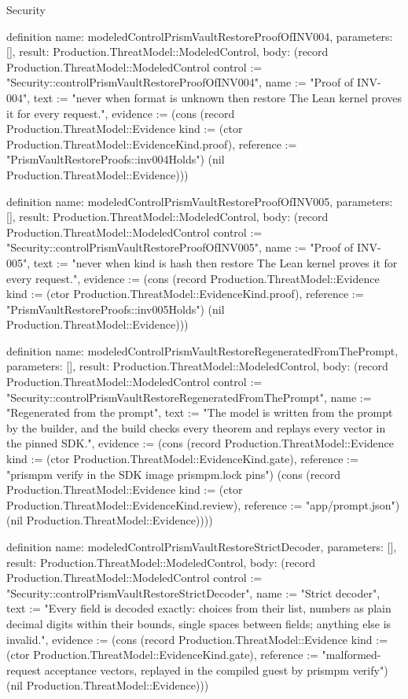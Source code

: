 \begin{lexlean}{Security}
\begin{semanticmodule}
definition{
  name: modeledControlPrismVaultRestoreProofOfINV004,
  parameters: [],
  result: Production.ThreatModel::ModeledControl,
  body: (record Production.ThreatModel::ModeledControl {control := "Security::controlPrismVaultRestoreProofOfINV004", name := "Proof of INV-004", text := "never when format is unknown then restore The Lean kernel proves it for every request.", evidence := (cons (record Production.ThreatModel::Evidence {kind := (ctor Production.ThreatModel::EvidenceKind.proof), reference := "PrismVaultRestoreProofs::inv004Holds"}) (nil Production.ThreatModel::Evidence))})
}

definition{
  name: modeledControlPrismVaultRestoreProofOfINV005,
  parameters: [],
  result: Production.ThreatModel::ModeledControl,
  body: (record Production.ThreatModel::ModeledControl {control := "Security::controlPrismVaultRestoreProofOfINV005", name := "Proof of INV-005", text := "never when kind is hash then restore The Lean kernel proves it for every request.", evidence := (cons (record Production.ThreatModel::Evidence {kind := (ctor Production.ThreatModel::EvidenceKind.proof), reference := "PrismVaultRestoreProofs::inv005Holds"}) (nil Production.ThreatModel::Evidence))})
}

definition{
  name: modeledControlPrismVaultRestoreRegeneratedFromThePrompt,
  parameters: [],
  result: Production.ThreatModel::ModeledControl,
  body: (record Production.ThreatModel::ModeledControl {control := "Security::controlPrismVaultRestoreRegeneratedFromThePrompt", name := "Regenerated from the prompt", text := "The model is written from the prompt by the builder, and the build checks every theorem and replays every vector in the pinned SDK.", evidence := (cons (record Production.ThreatModel::Evidence {kind := (ctor Production.ThreatModel::EvidenceKind.gate), reference := "prismpm verify in the SDK image prismpm.lock pins"}) (cons (record Production.ThreatModel::Evidence {kind := (ctor Production.ThreatModel::EvidenceKind.review), reference := "app/prompt.json"}) (nil Production.ThreatModel::Evidence)))})
}

definition{
  name: modeledControlPrismVaultRestoreStrictDecoder,
  parameters: [],
  result: Production.ThreatModel::ModeledControl,
  body: (record Production.ThreatModel::ModeledControl {control := "Security::controlPrismVaultRestoreStrictDecoder", name := "Strict decoder", text := "Every field is decoded exactly: choices from their list, numbers as plain decimal digits within their bounds, single spaces between fields; anything else is invalid.", evidence := (cons (record Production.ThreatModel::Evidence {kind := (ctor Production.ThreatModel::EvidenceKind.gate), reference := "malformed-request acceptance vectors, replayed in the compiled guest by prismpm verify"}) (nil Production.ThreatModel::Evidence))})
}


\end{semanticmodule}
\end{lexlean}
